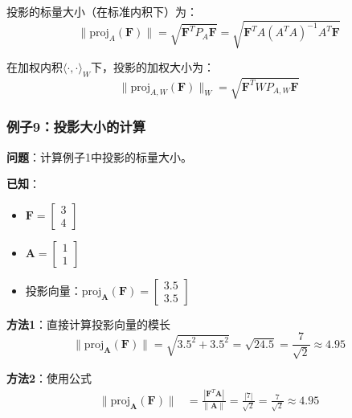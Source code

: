 \documentclass[12pt,a4paper]{article}
\begin{document}
投影的标量大小（在标准内积下）为：
\begin{equation}
\|\text{proj}_{A}(\bm{F})\| = \sqrt{\bm{F}^T P_A \bm{F}} = \sqrt{\bm{F}^T A (A^T A)^{-1} A^T \bm{F}}
\end{equation}

在加权内积$\langle \cdot, \cdot \rangle_W$下，投影的加权大小为：
\begin{equation}
\|\text{proj}_{A,W}(\bm{F})\|_W = \sqrt{\bm{F}^T W P_{A,W} \bm{F}}
\end{equation}

\subsubsection{例子9：投影大小的计算}

\textbf{问题}：计算例子1中投影的标量大小。

\textbf{已知}：
\begin{itemize}
\item $\bm{F} = \begin{bmatrix} 3 \\ 4 \end{bmatrix}$
\item $\bm{A} = \begin{bmatrix} 1 \\ 1 \end{bmatrix}$
\item 投影向量：$\text{proj}_{\bm{A}}(\bm{F}) = \begin{bmatrix} 3.5 \\ 3.5 \end{bmatrix}$
\end{itemize}

\textbf{方法1}：直接计算投影向量的模长
\begin{equation}
\|\text{proj}_{\bm{A}}(\bm{F})\| = \sqrt{3.5^2 + 3.5^2} = \sqrt{24.5} = \frac{7}{\sqrt{2}} \approx 4.95
\end{equation}

\textbf{方法2}：使用公式
\begin{align}
\|\text{proj}_{\bm{A}}(\bm{F})\| &= \frac{|\bm{F}^T \bm{A}|}{\|\bm{A}\|} = \frac{|7|}{\sqrt{2}} = \frac{7}{\sqrt{2}} \approx 4.95
\end{align}
\end{document}
